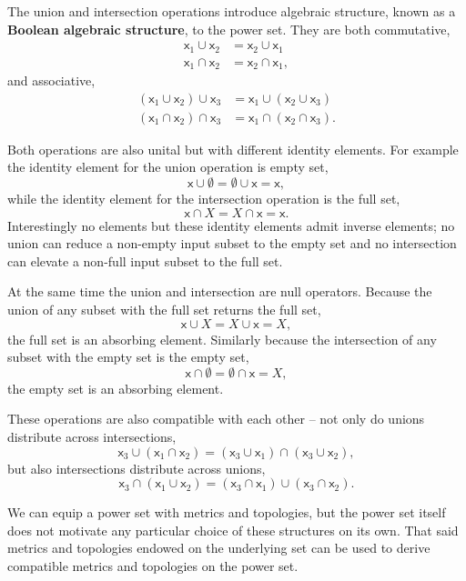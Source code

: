 \documentclass[
  letterpaper,
  DIV=11,
  numbers=noendperiod]{scrartcl}
\begin{document}
The union and intersection operations introduce algebraic structure,
known as a \textbf{Boolean algebraic structure}, to the power set. They
are both commutative, \begin{align*}
\mathsf{x}_{1} \cup \mathsf{x}_{2} &= \mathsf{x}_{2} \cup \mathsf{x}_{1}
\\
\mathsf{x}_{1} \cap \mathsf{x}_{2} &= \mathsf{x}_{2} \cap \mathsf{x}_{1},
\end{align*} and associative, \begin{align*}
(\mathsf{x}_{1} \cup \mathsf{x}_{2}) \cup \mathsf{x}_{3}
&=
\mathsf{x}_{1} \cup (\mathsf{x}_{2} \cup \mathsf{x}_{3})
\\
(\mathsf{x}_{1} \cap \mathsf{x}_{2}) \cap \mathsf{x}_{3}
&=
\mathsf{x}_{1} \cap (\mathsf{x}_{2} \cap \mathsf{x}_{3}).
\end{align*}

Both operations are also unital but with different identity elements.
For example the identity element for the union operation is empty set,
\[
\mathsf{x} \cup \emptyset = \emptyset \cup \mathsf{x} = \mathsf{x},
\] while the identity element for the intersection operation is the full
set, \[
\mathsf{x} \cap X = X \cap \mathsf{x} = \mathsf{x}.
\] Interestingly no elements but these identity elements admit inverse
elements; no union can reduce a non-empty input subset to the empty set
and no intersection can elevate a non-full input subset to the full set.

At the same time the union and intersection are null operators. Because
the union of any subset with the full set returns the full set, \[
\mathsf{x} \cup X = X \cup \mathsf{x} = X,
\] the full set is an absorbing element. Similarly because the
intersection of any subset with the empty set is the empty set, \[
\mathsf{x} \cap \emptyset = \emptyset \cap \mathsf{x} = X,
\] the empty set is an absorbing element.

These operations are also compatible with each other -- not only do
unions distribute across intersections, \[
\mathsf{x}_{3} \cup ( \mathsf{x}_{1} \cap \mathsf{x}_{2} )
=
(\mathsf{x}_{3} \cup \mathsf{x}_{1}) \cap (\mathsf{x}_{3} \cup \mathsf{x}_{2}),
\] but also intersections distribute across unions, \[
\mathsf{x}_{3} \cap ( \mathsf{x}_{1} \cup \mathsf{x}_{2} )
=
(\mathsf{x}_{3} \cap \mathsf{x}_{1}) \cup (\mathsf{x}_{3} \cap \mathsf{x}_{2}).
\]

We can equip a power set with metrics and topologies, but the power set
itself does not motivate any particular choice of these structures on
its own. That said metrics and topologies endowed on the underlying set
can be used to derive compatible metrics and topologies on the power
set.
\end{document}
